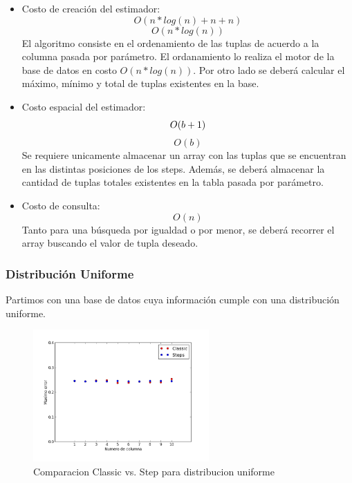 \documentclass[10pt, a4paper,english,spanish,hidelinks]{article}
\begin{document}
\begin{itemize}

\item Costo de creación del estimador: 
\begin{equation}
O(n*log(n) + n + n)
\end{equation}
\begin{equation}
O(n*log(n))
\end{equation}
El algoritmo consiste en el ordenamiento de las tuplas de acuerdo a la columna pasada por parámetro. El ordanamiento lo realiza el motor de la base de datos en costo $O(n*log(n))$. Por otro lado se deberá calcular el máximo, mínimo y total de tuplas existentes en la base. 

\item Costo espacial del estimador:
\begin{equation}
O(b + 1) \\
\end{equation}
\begin{equation}
O(b)
\end{equation}
Se requiere unicamente almacenar un array con las tuplas que se encuentran en las distintas posiciones de los steps. Además, se deberá almacenar la cantidad de tuplas totales existentes en la tabla pasada por parámetro. 

\item Costo de consulta:
\begin{equation}
O(n)
\end{equation}
Tanto para una búsqueda por igualdad o por menor, se deberá recorrer el array buscando el valor de tupla deseado. 

\end{itemize}

\subsubsection{Distribución Uniforme}

Partimos con una base de datos cuya información cumple con una distribución uniforme.

\begin{figure}[h!]
  \centering
  \includegraphics[width=0.6\textwidth]{./imagenes/ejb1_uniforme.png}
  \caption{Comparacion Classic vs. Step para distribucion uniforme}
\end{figure}
\end{document}
